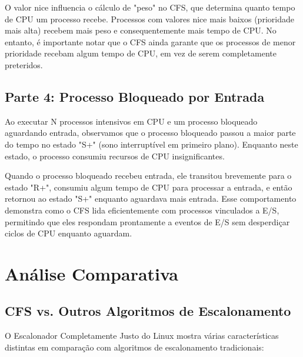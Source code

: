 \documentclass[12pt,a4paper]{article}
\begin{document}
O valor nice influencia o cálculo de "peso" no CFS, que determina quanto tempo de CPU um processo recebe. Processos com valores nice mais baixos (prioridade mais alta) recebem mais peso e consequentemente mais tempo de CPU. No entanto, é importante notar que o CFS ainda garante que os processos de menor prioridade recebam algum tempo de CPU, em vez de serem completamente preteridos.
\subsection{Parte 4: Processo Bloqueado por Entrada}

Ao executar N processos intensivos em CPU e um processo bloqueado aguardando entrada, observamos que o processo bloqueado passou a maior parte do tempo no estado "S+" (sono interruptível em primeiro plano). Enquanto neste estado, o processo consumiu recursos de CPU insignificantes.

Quando o processo bloqueado recebeu entrada, ele transitou brevemente para o estado "R+", consumiu algum tempo de CPU para processar a entrada, e então retornou ao estado "S+" enquanto aguardava mais entrada. Esse comportamento demonstra como o CFS lida eficientemente com processos vinculados a E/S, permitindo que eles respondam prontamente a eventos de E/S sem desperdiçar ciclos de CPU enquanto aguardam.

\section{Análise Comparativa}

\subsection{CFS vs. Outros Algoritmos de Escalonamento}

O Escalonador Completamente Justo do Linux mostra várias características distintas em comparação com algoritmos de escalonamento tradicionais:
\end{document}
